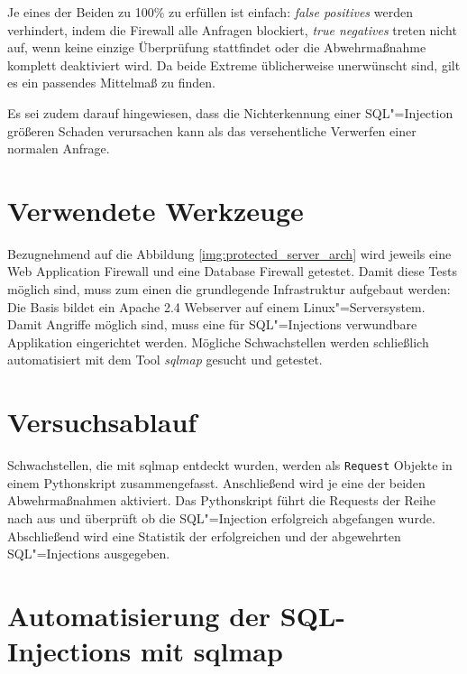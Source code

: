 Je eines der Beiden zu 100\% zu erfüllen ist einfach: \emph{false positives} werden verhindert, indem die Firewall alle Anfragen blockiert, \emph{true negatives} treten nicht auf, wenn keine einzige Überprüfung stattfindet oder die Abwehrmaßnahme komplett deaktiviert wird. Da beide Extreme üblicherweise unerwünscht sind, gilt es ein passendes Mittelmaß zu finden.

Es sei zudem darauf hingewiesen, dass die Nichterkennung einer SQL"=Injection größeren Schaden verursachen kann als das versehentliche Verwerfen einer normalen Anfrage.

\section{Verwendete Werkzeuge}

Bezugnehmend auf die Abbildung \ref{img:protected_server_arch} wird jeweils eine Web Application Firewall und eine Database Firewall getestet. Damit diese Tests möglich sind, muss zum einen die grundlegende Infrastruktur aufgebaut werden: Die Basis bildet ein Apache 2.4 Webserver auf einem Linux"=Serversystem. Damit Angriffe möglich sind, muss eine für SQL"=Injections verwundbare Applikation eingerichtet werden. Mögliche Schwachstellen werden schließlich automatisiert mit dem Tool \emph{sqlmap} gesucht und getestet.

\section{Versuchsablauf}

Schwachstellen, die mit sqlmap entdeckt wurden, werden als \texttt{Request} Objekte in einem Pythonskript zusammengefasst. Anschließend wird je eine der beiden Abwehrmaßnahmen aktiviert. Das Pythonskript führt die Requests der Reihe nach aus und überprüft ob die SQL"=Injection erfolgreich abgefangen wurde. Abschließend wird eine Statistik der erfolgreichen und der abgewehrten SQL"=Injections ausgegeben.


\section{Automatisierung der SQL-Injections mit sqlmap}

